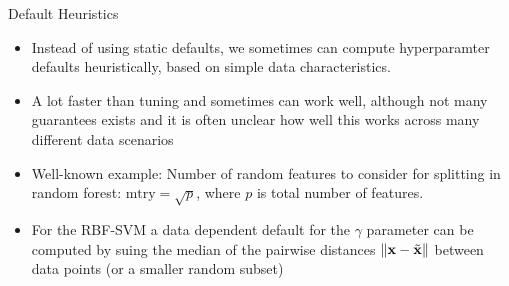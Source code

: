

\begin{frame}{Default Heuristics}

    \begin{itemize}
            \item Instead of using static defaults, we sometimes can compute hyperparamter defaults heuristically, based on simple data characteristics.
            \item A lot faster than tuning and sometimes can work well,
                although not many guarantees exists and it is often unclear how well this works across many different data scenarios
            \item Well-known example: Number of random features to consider for splitting in random forest: $\text{mtry} = \sqrt{p}$, where $p$ is total number of features.
            \item For the RBF-SVM a data dependent default for the $\gamma$ parameter can be computed by suing the median of the pairwise distances $\|\mathbf{x} - \tilde {\mathbf{x}} \|$ between data points (or a smaller random subset)
    \end{itemize}
\end{frame}


